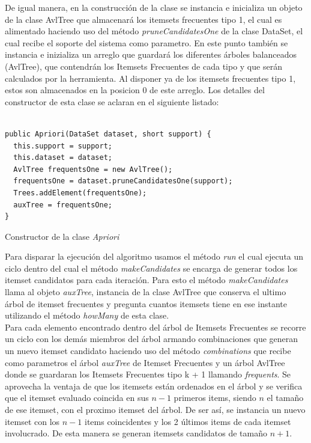 De igual manera, en la construcci\'on de la clase se instancia e inicializa un objeto de la clase AvlTree que
almacenar\'a los itemsets frecuentes tipo 1, el cual es alimentado haciendo uso del m\'etodo
\textit{pruneCandidatesOne} de la clase DataSet, el cual recibe el soporte del sistema como parametro.  En este
punto tambi\'en se instancia e inizializa  un arreglo que guardar\'a los diferentes \'arboles balanceados
(AvlTree), que contendr\'an los Itemsets Frecuentes de cada tipo y que ser\'an calculados por la herramienta. Al
disponer ya de los itemsets frecuentes tipo 1, estos son almacenados en la posicion 0 de este arreglo.  Los
detalles del constructor de esta clase se aclaran en el siguiente listado:\\

\begin{codigof}[h]
\begin{verbatim}

public Apriori(DataSet dataset, short support) {
  this.support = support;
  this.dataset = dataset;
  AvlTree frequentsOne = new AvlTree();
  frequentsOne = dataset.pruneCandidatesOne(support);
  Trees.addElement(frequentsOne);
  auxTree = frequentsOne;
}
\end{verbatim}
\caption{Constructor de la clase \textit{Apriori}}
\end{codigof}

Para disparar la ejecuci\'on del algoritmo usamos el m\'etodo \textit{run} el cual ejecuta un ciclo dentro del
cual el m\'etodo \textit{makeCandidates} se encarga de generar todos los itemset candidatos para cada
iteraci\'on.  Para esto el m\'etodo \textit{makeCandidates} llama al objeto \textit{auxTree}, instancia de la
clase AvlTree que conserva el ultimo \'arbol de itemset frecuentes y pregunta cuantos itemsets tiene en ese
instante utilizando el m\'etodo \textit{howMany} de esta clase.\\

Para cada elemento encontrado dentro del \'arbol de Itemsets Frecuentes se recorre un ciclo con los dem\'as
miembros del \'arbol armando combinaciones que generan un nuevo itemset candidato haciendo uso del m\'etodo
\textit{combinations} que recibe como parametros el \'arbol \textit{auxTree} de Itemset Frecuentes y un \'arbol
AvlTree donde se guardaran los Itemsets Frecuentes tipo k + 1 llamando \textit{frequents}.  Se aprovecha la
ventaja de que los itemsets est\'an ordenados en el \'arbol y se verifica que el itemset evaluado coincida en sus
$n-1$ primeros items, siendo $n$ el tama\~no de ese itemset, con el proximo itemset del \'arbol. De ser as\'i, se
instancia un nuevo itemset con los $n-1$ items coincidentes y los 2 \'ultimos items de cada itemset involucrado. 
De esta manera se generan itemsets candidatos de tama\~no $n+1$.\\

